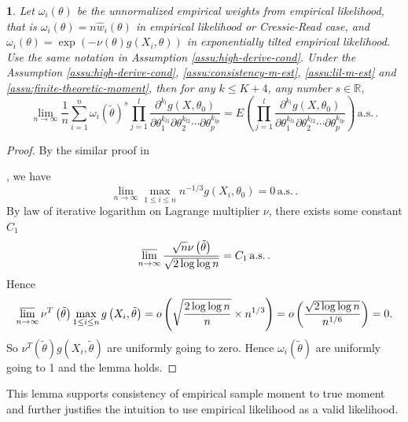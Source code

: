 \documentclass[oneside,english]{amsbook}
\numberwithin{section}{chapter}
\numberwithin{equation}{section}
\numberwithin{figure}{section}
\theoremstyle{plain}
\newtheorem{lem}{\protect\lemmaname}
\theoremstyle{plain}
\theoremstyle{definition}
\theoremstyle{plain}
\theoremstyle{plain}
\theoremstyle{remark}
\theoremstyle{definition}
\theoremstyle{definition}
\newcommand{\ascv}{\,\mathrm{a.s.}\,}
\providecommand{\lemmaname}{Lemma}
\begin{document}
\begin{lem}
\label{lem:finite-empirical weight moment}Let $\omega_{i}\left(\theta\right)$
be the unnormalized empirical weights from empirical likelihood, that
is $\omega_{i}\left(\theta\right)=n\hat{w}_{i}\left(\theta\right)$
in empirical likelihood or Cressie-Read case, and $\omega_{i}\left(\theta\right)=\exp\left(-\nu\left(\theta\right)g\left(X_{i},\theta\right)\right)$
in exponentially tilted empirical likelihood. Use the same notation
in Assumption \ref{assu:high-derive-cond}. Under the Assumption \ref{assu:high-derive-cond},
\ref{assu:consistency-m-est}, \ref{assu:lil-m-est} and \ref{assu:finite-theoretic-moment},
then for any $k\le K+4$, any number $s\in\mathbb{R}$, 
\[
\lim_{n\rightarrow\infty}\frac{1}{n}\sum_{i=1}^{n}\omega_{i}\left(\tilde{\theta}\right)^{s}\prod_{j=1}^{l}\frac{\partial^{k_{l}}g\left(X,\theta_{0}\right)}{\partial\theta_{1}^{k_{l1}}\partial\theta_{2}^{k_{l2}}\cdots\partial\theta_{p}^{k_{lp}}}=E\left(\prod_{j=1}^{l}\frac{\partial^{k_{l}}g\left(X,\theta_{0}\right)}{\partial\theta_{1}^{k_{l1}}\partial\theta_{2}^{k_{l2}}\cdots\partial\theta_{p}^{k_{lp}}}\right)\ascv.
\]
\end{lem}
\begin{proof}
By the similar proof in %

{} \citet{owen2010empirical}, we have 
\[
\lim_{n\rightarrow\infty}\max_{1\le i\le n}n^{-1/3}g\left(X_{i},\theta_{0}\right)=0\ascv.
\]
By law of iterative logarithm on Lagrange multiplier $\nu$, there
exists some constant $C_{1}$ 
\[
\varlimsup_{n\rightarrow\infty}\frac{\sqrt{n}\nu\left(\tilde{\theta}\right)}{\sqrt{2\log\log n}}=C_{1}\ascv.
\]
Hence 
\[
\varlimsup_{n\rightarrow\infty}\nu^{T}\left(\tilde{\theta}\right)\max_{1\le i\le n}g\left(X_{i},\tilde{\theta}\right)=o\left(\sqrt{\frac{2\log\log n}{n}}\times n^{1/3}\right)=o\left(\frac{\sqrt{2\log\log n}}{n^{1/6}}\right)=0.
\]
So $\nu^{T}\left(\tilde{\theta}\right)g\left(X_{i},\tilde{\theta}\right)$
are uniformly going to zero. Hence $\omega_{i}\left(\tilde{\theta}\right)$
are uniformly going to 1 and the lemma holds.
\end{proof}
This lemma supports consistency of empirical sample moment to true
moment and further justifies the intuition to use empirical likelihood
as a valid likelihood. 
\end{document}
